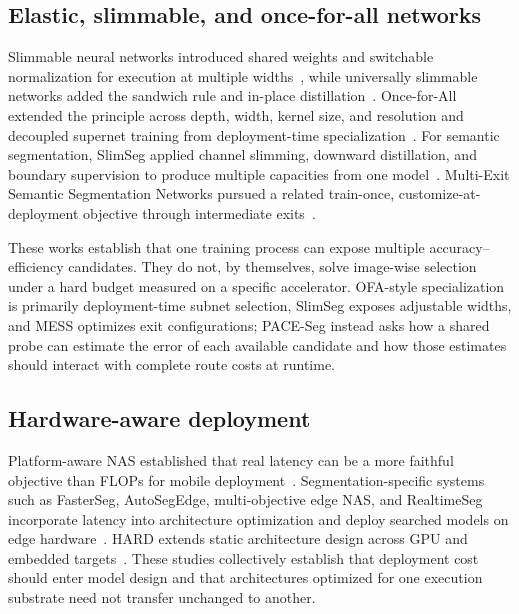 \documentclass[a4paper,review,12pt]{elsarticle}
\newcommand{\method}{PACE-Seg}
\begin{document}
\subsection{Elastic, slimmable, and once-for-all networks}

Slimmable neural networks introduced shared weights and switchable normalization for execution at multiple widths~\cite{yu2019slimmable}, while universally slimmable networks added the sandwich rule and in-place distillation~\cite{yu2019usnet}. Once-for-All extended the principle across depth, width, kernel size, and resolution and decoupled supernet training from deployment-time specialization~\cite{cai2020ofa}. For semantic segmentation, SlimSeg applied channel slimming, downward distillation, and boundary supervision to produce multiple capacities from one model~\cite{xue2022slimseg}. Multi-Exit Semantic Segmentation Networks pursued a related train-once, customize-at-deployment objective through intermediate exits~\cite{kouris2022mess}.

These works establish that one training process can expose multiple accuracy--efficiency candidates. They do not, by themselves, solve image-wise selection under a hard budget measured on a specific accelerator. OFA-style specialization is primarily deployment-time subnet selection, SlimSeg exposes adjustable widths, and MESS optimizes exit configurations; \method{} instead asks how a shared probe can estimate the error of each available candidate and how those estimates should interact with complete route costs at runtime.

\subsection{Hardware-aware deployment}

Platform-aware NAS established that real latency can be a more faithful objective than FLOPs for mobile deployment~\cite{tan2019mnasnet}. Segmentation-specific systems such as FasterSeg, AutoSegEdge, multi-objective edge NAS, and RealtimeSeg incorporate latency into architecture optimization and deploy searched models on edge hardware~\cite{chen2020fasterseg,dou2023autosegedge,dou2024multiobjective,li2023realtimeseg}. HARD extends static architecture design across GPU and embedded targets~\cite{kwon2024hard}. These studies collectively establish that deployment cost should enter model design and that architectures optimized for one execution substrate need not transfer unchanged to another.
\end{document}
